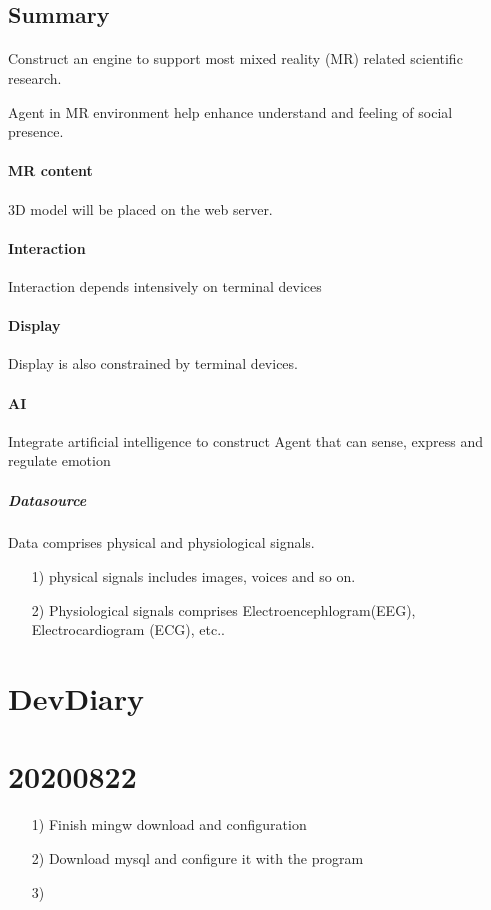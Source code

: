 \documentclass{article}
\begin{document}
\subsection{Summary}
\paragraph{}
Construct an engine to support most mixed
reality (MR) related scientific research.

Agent in MR environment help enhance understand and 
feeling of social presence.

\paragraph{MR content}
3D model will be placed on the web server.

\paragraph{Interaction}
Interaction depends intensively on terminal devices

\paragraph{Display}
Display is also constrained by terminal devices.

\paragraph{AI}
Integrate artificial intelligence to construct Agent
that can sense, express and regulate emotion

    \subparagraph{Datasource}
    Data comprises physical and physiological signals.
    \begin{enumerate}
    \item[1)]
    physical signals includes images, voices and so on.
    \item[2)]
    Physiological signals comprises Electroencephlogram(EEG), Electrocardiogram
    (ECG), etc..
    \end{enumerate}




\section{DevDiary}
\section{20200822}
\begin{enumerate}
    \item[1)] 
    Finish mingw download and configuration
    \item[2)] 
    Download mysql and configure it with the program
    \item[3)] 
     
\end{enumerate}






\end{document}

